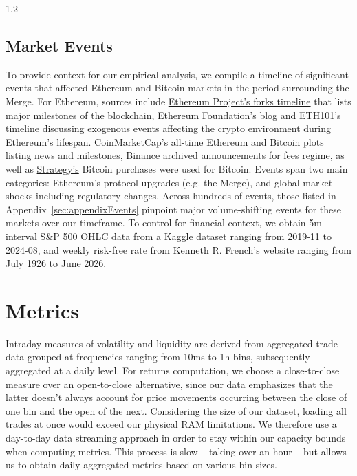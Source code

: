 \documentclass[10pt]{article}
\begin{document}
\begin{setstretch}{1.2}
    \subsection{Market Events}

To provide context for our empirical analysis, we compile a timeline of significant events that affected Ethereum and Bitcoin markets in the period surrounding the Merge. For Ethereum, sources include \href{https://ethereum.org/ethereum-forks/}{Ethereum Project's forks timeline} that lists major milestones of the blockchain, \href{https://blog.ethereum.org}{Ethereum Foundation's blog} and \href{https://www.eth101.org/en/history}{ETH101's timeline} discussing exogenous events affecting the crypto environment during Ethereum's lifespan. CoinMarketCap's all-time Ethereum and Bitcoin plots listing news and milestones, Binance archived announcements for fees regime, as well as \href{https://www.strategy.com/ledger}{Strategy's} Bitcoin purchases were used for Bitcoin. Events span two main categories: Ethereum's protocol upgrades (e.g. the Merge), and global market shocks including regulatory changes. Across hundreds of events, those listed in Appendix~\ref{sec:appendixEvents} pinpoint major volume-shifting events for these markets over our timeframe. To control for financial context, we obtain 5m interval S\&P 500 OHLC data from a \href{https://www.kaggle.com/datasets/salaheddineelkhirani/5-year-data-for-s-and-p-500-and-nasdaq-100/data}{Kaggle dataset} ranging from 2019-11 to 2024-08, and weekly risk-free rate from \href{https://mba.tuck.dartmouth.edu/pages/faculty/ken.french/data_library.html}{Kenneth R. French's website} ranging from July 1926 to June 2026. 


\section{Metrics}
\label{sec:metrics}

Intraday measures of volatility and liquidity are derived from aggregated trade data grouped at frequencies ranging from 10ms to 1h bins, subsequently aggregated at a daily level. For returns computation, we choose a close-to-close measure over an open-to-close alternative, since our data emphasizes that the latter doesn't always account for price movements occurring between the close of one bin and the open of the next. Considering the size of our dataset, loading all trades at once would exceed our physical RAM limitations. We therefore use a day-to-day data streaming approach in order to stay within our capacity bounds when computing metrics. This process is slow -- taking over an hour -- but allows us to obtain daily aggregated metrics based on various bin sizes. 


\end{setstretch}
\end{document}
